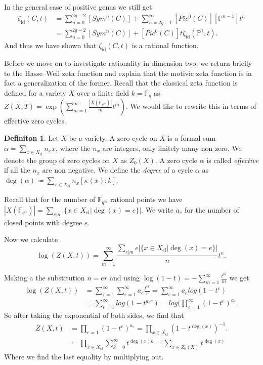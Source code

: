 \documentclass[11pt, a4paper, german]{article}
\theoremstyle{plain}
\theoremstyle{definition}
\newtheorem{definition}[theorem]{Definiton}
\begin{document}
In the general case of positive genus we still get
\begin{align*}
    \zeta_{\mathrm{id}}(C,t) &= \sum_{n=0}^{2g-2} [Sym^n(C)] + \sum_{n=2g-1}^\infty [Pic^0(C)][\mathbb{P}^{n-1}]t^n\\
                             &= \sum_{n=0}^{2g-2} [Sym^n(C)] + [Pic^0(C)]t\zeta_{\mathrm{id}}(\mathbb{P}^1, t).
\end{align*}
And thus we have shown that $\zeta_{\mathrm{id}}(C,t)$ is a rational function.

Before we move on to investigate rationality in dimension two, we return briefly to the Hasse--Weil zeta function and explain that the 
motivic zeta function is in fact a generalization of the former.
Recall that the classical zeta function is defined for a variety $X$ over a finite field $k = \mathbb{F}_q$ as 
$Z(X,T) = \exp(\sum_{m=1}^\infty \frac{|X(\mathbb{F}_{q^m})|}{m}t^m)$. We would like to rewrite this in terms of effective zero cycles.
\begin{definition}
    Let $X$ be a variety. A zero cycle on $X$ is a formal sum $\alpha = \sum_{x \in X_\mathrm{cl}} n_x x$, where the $n_x$ are integers,
    only finitely many non zero. We denote the group of zero cycles on $X$ as $Z_0(X)$. A zero cycle $\alpha$ is called
    \emph{effective} if all the $n_x$ are non negative. We define the \emph{degree} of a cycle $\alpha$ as 
    $\deg(\alpha) \coloneqq \sum_{x \in X_{\mathrm{cl}}} n_x [\kappa(x):k]$.
\end{definition}

Recall that for the number of $\mathbb{F}_{q^m}$ rational points we have
$|X(\mathbb{F}_{q^n})| = \sum_{e | n} |\{x \in X_{\mathrm{cl}} | \deg(x) = e\}|$. We write $a_e$ for the number of closed points with degree $e$.

Now we calculate
\[
\log(Z(X,t)) = \sum_{m=1}^\infty \frac{\sum_{e | m} e|\{x \in X_{\mathrm{cl}} | \deg(x) = e\}|}{n} t^n.
\]

Making a the substitution $n = er$ and using $\log(1-t) = - \sum_{m=1}^\infty \frac{t^m}{m}$ we get 
\begin{align*}
    \log(Z(X,t)) &= \sum_{r=1}^\infty \sum_{e=1}^\infty a_e \frac{t^{er}}{r} = \sum_{e=1}^\infty a_e log(1-t^e) \\
    &= \sum_{e=1}^\infty log(1-t^{a_e e}) = log(\prod_{e=1}^\infty (1-t^e)^{a_e}.
\end{align*}
So after taking the exponential of both sides, we find that
\begin{align*}
    Z(X,t) &= \prod_{e=1} (1-t^e)^{a_e} = \prod_{x \in X_{\mathrm{cl}}} (1-t^{\deg(x)})^{-1}.\\
           &= \prod_{x \in X_{\mathrm{cl}}} \sum_{k=0}^\infty t^{\deg(x)k} = \sum_{x \in Z_0(X)} t^{\deg(x)}
\end{align*}
Where we find the last equality by multiplying out.
\end{document}
